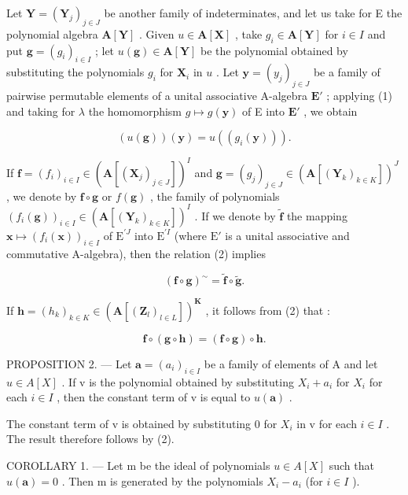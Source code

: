 Let \(\mathbf{Y} = (\mathbf{Y}_j)_{j\in J}\) be another family of indeterminates, and let us take for E the polynomial algebra \(\mathbf{A}[\mathbf{Y}]\) . Given \(u\in \mathbf{A}[\mathbf{X}]\) , take \(g_{i}\in \mathbf{A}[\mathbf{Y}]\) for \(i\in I\) and put \(\mathbf{g} = (g_i)_{i\in I}\) ; let \(u(\mathbf{g})\in \mathbf{A}[\mathbf{Y}]\) be the polynomial obtained by substituting the polynomials \(g_{i}\) for \(\mathbf{X}_i\) in \(u\) . Let \(\mathbf{y} = (y_j)_{j\in J}\) be a family of pairwise permutable elements of a unital associative A-algebra \(\mathbf{E}'\) ; applying (1) and taking for \(\lambda\) the homomorphism \(g\mapsto g(\mathbf{y})\) of E into \(\mathbf{E}'\) , we obtain

\[
(u (\mathbf {g})) (\mathbf {y}) = u \left(\left(g _ {i} (\mathbf {y})\right)\right).\tag{2}
\]

If \(\mathbf{f} = (f_i)_{i\in I}\in (\mathbf{A}[(\mathbf{X}_j)_{j\in J}])^I\) and \(\mathbf{g} = (g_j)_{j\in J}\in (\mathbf{A}[(\mathbf{Y}_k)_{k\in K}])^J\) , we denote by \(\mathbf{f}\circ \mathbf{g}\) or \(f(\mathbf{g})\) , the family of polynomials \((f_i(\mathbf{g}))_{i\in I}\in (\mathbf{A}[(\mathbf{Y}_k)_{k\in K}])^I\) . If we denote by \(\tilde{\mathbf{f}}\) the mapping \(\mathbf{x} \mapsto (f_i(\mathbf{x}))_{i \in I}\) of \(\mathrm{E}^{\prime J}\) into \(\mathrm{E}^{\prime I}\) (where \(\mathrm{E}'\) is a unital associative and commutative A-algebra), then the relation (2) implies

\[
(\mathbf {f} \circ \mathbf {g}) ^ {\sim} = \tilde {\mathbf {f}} \circ \tilde {\mathbf {g}}.\tag{3}
\]

If \(\mathbf{h} = (h_k)_{k\in K}\in (\mathbf{A}[(\mathbf{Z}_l)_{l\in L}])^{\mathbf{K}}\) , it follows from (2) that :

\[
\mathbf {f} \circ (\mathbf {g} \circ \mathbf {h}) = (\mathbf {f} \circ \mathbf {g}) \circ \mathbf {h}.\tag{4}
\]

PROPOSITION 2. --- Let \(\mathbf{a} = (a_i)_{i \in I}\) be a family of elements of A and let \(u \in A[X]\) . If v is the polynomial obtained by substituting \(X_i + a_i\) for \(X_i\) for each \(i \in I\) , then the constant term of v is equal to \(u(\mathbf{a})\) .

The constant term of v is obtained by substituting 0 for \(X_{i}\) in v for each \(i \in I\) . The result therefore follows by (2).

COROLLARY 1. --- Let m be the ideal of polynomials \(u \in A[X]\) such that \(u(\mathbf{a}) = 0\) . Then m is generated by the polynomials \(X_{i} - a_{i}\) (for \(i \in I\) ).

